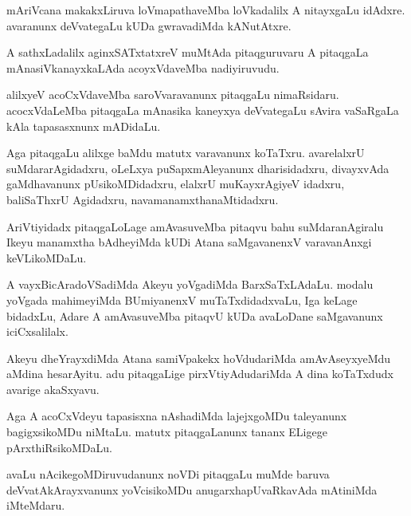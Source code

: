 \documentclass{article}
\begin{document}
\begin{mn}
mAriVcana makakxLiruva loVmapathaveMba loVkadalilx A nitayxgaLu
idAdxre. avaranunx deVvategaLu kUDa gwravadiMda kANutAtxre.
\end{mn}

\begin{mn}
A sathxLadalilx aginxSATxtatxreV muMtAda pitaqguruvaru A pitaqgaLa
mAnasiVkanayxkaLAda acoyxVdaveMba nadiyiruvudu.
\end{mn}

\begin{mn}
alilxyeV acoCxVdaveMba saroVvaravanunx pitaqgaLu
nimaRsidaru. acocxVdaLeMba pitaqgaLa mAnasika kaneyxya deVvategaLu
sAvira vaSaRgaLa kAla tapasasxnunx mADidaLu.
\end{mn}

\begin{mn}%
Aga pitaqgaLu alilxge baMdu matutx varavanunx koTaTxru. avarelalxrU
suMdararAgidadxru, oLeLxya puSapxmAleyanunx dharisidadxru, divayxvAda
gaMdhavanunx pUsikoMDidadxru, elalxrU muKayxrAgiyeV idadxru,
baliSaThxrU Agidadxru, navamanamxthanaMtidadxru.
\end{mn}

\begin{mn}
AriVtiyidadx pitaqgaLoLage amAvasuveMba pitaqvu bahu suMdaranAgiralu
Ikeyu manamxtha bAdheyiMda kUDi Atana saMgavanenxV varavanAnxgi keVLikoMDaLu.
\end{mn}

\begin{mn}%
A vayxBicAradoVSadiMda Akeyu yoVgadiMda BarxSaTxLAdaLu. modalu yoVgada
mahimeyiMda BUmiyanenxV muTaTxdidadxvaLu, Iga keLage bidadxLu, Adare A
amAvasuveMba pitaqvU kUDa avaLoDane saMgavanunx iciCxsalilalx.
\end{mn}

\begin{mn}
Akeyu dheYrayxdiMda Atana samiVpakekx hoVdudariMda amAvAseyxyeMdu
aMdina hesarAyitu. adu pitaqgaLige pirxVtiyAdudariMda A dina
koTaTxdudx avarige akaSxyavu.
\end{mn}

\begin{mn}%
Aga A acoCxVdeyu tapasisxna nAshadiMda lajejxgoMDu taleyanunx
bagigxsikoMDu niMtaLu. matutx pitaqgaLanunx tananx ELigege pArxthiRsikoMDaLu.
\end{mn}

\begin{mn}
avaLu nAcikegoMDiruvudanunx noVDi pitaqgaLu muMde baruva
deVvatAkArayxvanunx yoVcisikoMDu anugarxhapUvaRkavAda mAtiniMda iMteMdaru.
\end{mn}
\end{document}
